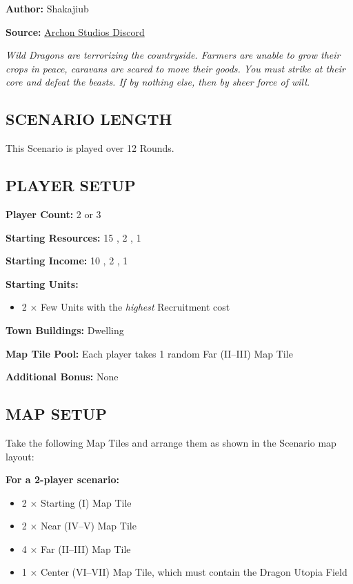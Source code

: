 
\begin{multicols*}{2}

\textbf{Author:} Shakajiub

\textbf{Source:} \href{https://discord.com/channels/740870068178649108/1237891632448278618}{Archon Studios Discord}

\textit{Wild Dragons are terrorizing the countryside.
Farmers are unable to grow their crops in peace, caravans are scared to move their goods.
You must strike at their core and defeat the beasts.
If by nothing else, then by sheer force of will.}

\subsection*{\MakeUppercase{Scenario Length}}
This Scenario is played over 12 Rounds.

\subsection*{\MakeUppercase{Player Setup}}
\textbf{Player Count:} 2 or 3

\textbf{Starting Resources:} 15 , 2 , 1 

\textbf{Starting Income:} 10 , 2 , 1 

\textbf{Starting Units:}
\begin{itemize}
  \item 2 × Few  Units with the \textit{highest} Recruitment cost
\end{itemize}

\textbf{Town Buildings:}  Dwelling

\textbf{Map Tile Pool:} Each player takes 1 random Far (II--III) Map Tile

\textbf{Additional Bonus:} None

\subsection*{\MakeUppercase{Map Setup}}
Take the following Map Tiles and arrange them as shown in the Scenario map layout:

\textbf{For a 2-player scenario:}
\begin{itemize}
  \item 2 × Starting (I) Map Tile
  \item 2 × Near (IV--V) Map Tile
  \item 4 × Far (II--III) Map Tile
  \item 1 × Center (VI--VII) Map Tile, which must contain the Dragon Utopia Field
\end{itemize}


\end{multicols*}
